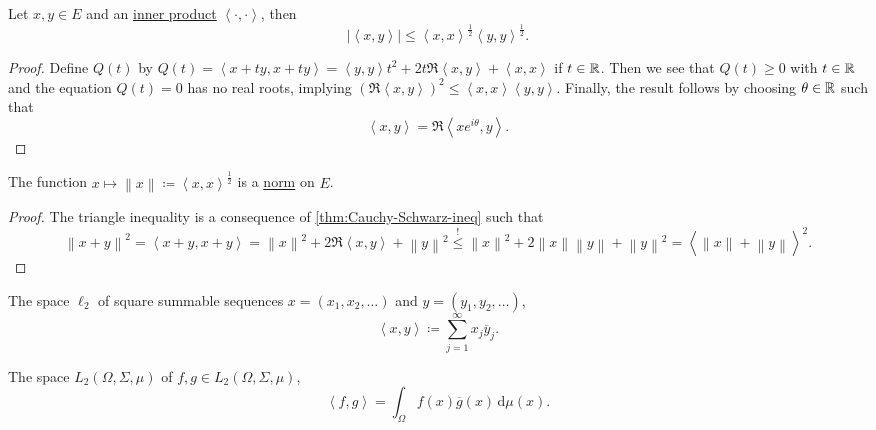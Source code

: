 \begin{theorem}\label{thm:Cauchy-Schwarz-ineq}
	Let \(x, y\in E\) and an \hyperref[def:inner-product]{inner product} \(\left\langle \cdot, \cdot \right\rangle \), then
	\[
		\left\vert \left\langle x, y \right\rangle  \right\vert \leq \left\langle x, x \right\rangle ^{\frac{1}{2}}\left\langle y, y \right\rangle ^{\frac{1}{2}}.
	\]
\end{theorem}
\begin{proof}
	Define \(Q(t)\) by \(Q(t) = \left\langle x+ty, x+ty \right\rangle = \left\langle y, y \right\rangle t^{2} + 2t \Re\left\langle x, y \right\rangle + \left\langle x,x \right\rangle\) if \(t\in \mathbb{\MakeUppercase{r}} \). Then we see that \(Q(t) \geq 0\) with \(t\in \mathbb{\MakeUppercase{r}} \) and the equation \(Q(t) = 0\) has no real roots, implying \((\Re\left\langle x, y \right\rangle) ^{2} \leq \left\langle x, x \right\rangle \left\langle y, y \right\rangle\). Finally, the result follows by choosing \(\theta \in \mathbb{\MakeUppercase{r}} \) such that
	\[
		\left\langle x, y \right\rangle = \Re\left\langle x e^{i\theta}, y \right\rangle.
	\]
\end{proof}

\begin{corollary}
	The function \(x\mapsto \left\lVert x\right\rVert \coloneqq \left\langle x, x \right\rangle ^{\frac{1}{2}}\) is a \hyperref[def:norm]{norm} on \(E\).
\end{corollary}
\begin{proof}
	The triangle inequality is a consequence of \autoref{thm:Cauchy-Schwarz-ineq} such that
	\[
		\left\lVert x+y\right\rVert ^{2} = \left\langle x+y, x+y \right\rangle = \left\lVert x\right\rVert ^{2} + 2\Re\left\langle x, y \right\rangle + \left\lVert y\right\rVert ^{2} \overset{\hyperref[thm:Cauchy-Schwarz-ineq]{\text{!}}}{\leq} \left\lVert x\right\rVert ^{2} + 2\left\lVert x\right\rVert \left\lVert y\right\rVert + \left\lVert y\right\rVert ^{2} = \left\langle \left\lVert x\right\rVert + \left\lVert y\right\rVert  \right\rangle ^{2} .
	\]
\end{proof}

\begin{eg}
	The space \(\ell _2\) of square summable sequences \(x=(x_1, x_2, \ldots  )\) and \(y=(y_1, y_2, \ldots  )\),
	\[
		\left\langle x, y \right\rangle \coloneqq \sum_{j=1}^{\infty} x_j \overline{y} _j.
	\]
\end{eg}

\begin{eg}
	The space \(L_2(\Omega , \Sigma , \mu )\) of \(f, g\in L_2(\Omega , \Sigma , \mu )\),
	\[
		\left\langle f, g \right\rangle = \int _\Omega f(x) \overline{g} (x)\,\mathrm{d} \mu (x).
	\]
\end{eg}


